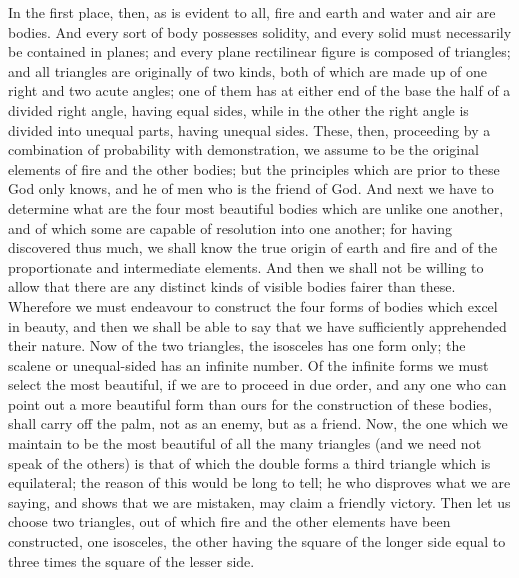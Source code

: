 In the first place, then, as is evident to all, fire and earth and water
and air are bodies. And every sort of body possesses solidity, and every
solid must necessarily be contained in planes; and every plane rectilinear
figure is composed of triangles; and all triangles are originally of two
kinds, both of which are made up of one right and two acute angles; one of
them has at either end of the base the half of a divided right angle,
having equal sides, while in the other the right angle is divided into
unequal parts, having unequal sides. These, then, proceeding by a
combination of probability with demonstration, we assume to be the
original elements of fire and the other bodies; but the principles which
are prior to these God only knows, and he of men who is the friend of God.
And next we have to determine what are the four most beautiful bodies
which are unlike one another, and of which some are capable of resolution
into one another; for having discovered thus much, we shall know the true
origin of earth and fire and of the proportionate and intermediate
elements. And then we shall not be willing to allow that there are any
distinct kinds of visible bodies fairer than these. Wherefore we must
endeavour to construct the four forms of bodies which excel in beauty, and
then we shall be able to say that we have sufficiently apprehended their
nature. Now of the two triangles, the isosceles has one form only; the
scalene or unequal-sided has an infinite number. Of the infinite forms we
must select the most beautiful, if we are to proceed in due order, and any
one who can point out a more beautiful form than ours for the construction
of these bodies, shall carry off the palm, not as an enemy, but as a
friend. Now, the one which we maintain to be the most beautiful of all the
many triangles (and we need not speak of the others) is that of which the
double forms a third triangle which is equilateral; the reason of this
would be long to tell; he who disproves what we are saying, and shows that
we are mistaken, may claim a friendly victory. Then let us choose two
triangles, out of which fire and the other elements have been constructed,
one isosceles, the other having the square of the longer side equal to
three times the square of the lesser side.

